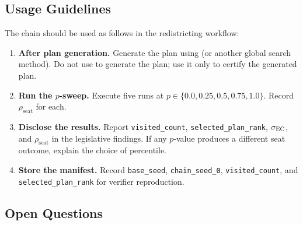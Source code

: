 \subsection{Usage Guidelines}

The \flip{} chain should be used as follows in the redistricting workflow:

\begin{enumerate}
  \item \textbf{After plan generation.} Generate the plan using \cs{} (or
        another global search method). Do not use \flip{} to generate the
        plan; use it only to certify the generated plan.
  \item \textbf{Run the $p$-sweep.} Execute five \flip{} runs at
        $p \in \{0.0, 0.25, 0.5, 0.75, 1.0\}$.
        Record $\rho_{\mathrm{seat}}$ for each.
  \item \textbf{Disclose the results.} Report \texttt{visited\_count},
        \texttt{selected\_plan\_rank}, $\sigma_{\mathrm{EC}}$, and
        $\rho_{\mathrm{seat}}$ in the legislative findings.
        If any $p$-value produces a different seat outcome, explain the
        choice of percentile.
  \item \textbf{Store the manifest.} Record \texttt{base\_seed},
        \texttt{chain\_seed\_0}, \texttt{visited\_count}, and
        \texttt{selected\_plan\_rank} for verifier reproduction.
\end{enumerate}

\subsection{Open Questions}

